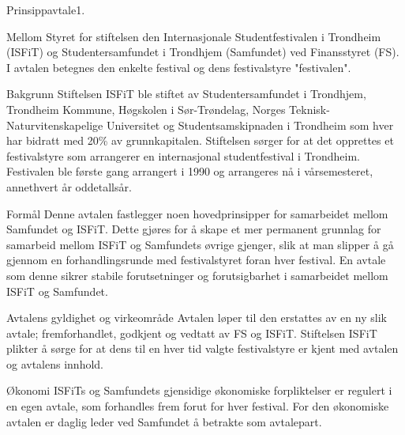 
\begin{instruks}{Prinsippavtale}{1. }{ }

    \begin{instruksledd}{Mellom Styret for stiftelsen den Internasjonale Studentfestivalen i
        Trondheim (ISFiT) og Studentersamfundet i Trondhjem (Samfundet) ved Finansstyret (FS).}
        I avtalen betegnes den enkelte festival og dens festivalstyre "festivalen".
    \end{instruksledd}

    \begin{instruksledd}{Bakgrunn}
        Stiftelsen ISFiT ble stiftet av Studentersamfundet i Trondhjem, Trondheim Kommune, Høgskolen
        i Sør-Trøndelag, Norges Teknisk-Naturvitenskapelige Universitet og Studentsamskipnaden i Trondheim
        som hver har bidratt med 20\% av grunnkapitalen. Stiftelsen sørger for at det opprettes et
        festivalstyre som arrangerer en internasjonal studentfestival i Trondheim. Festivalen ble første
        gang arrangert i 1990 og arrangeres nå i vårsemesteret, annethvert år oddetallsår.
    \end{instruksledd}

    \begin{instruksledd}{Formål}
        Denne avtalen fastlegger noen hovedprinsipper for samarbeidet mellom Samfundet og ISFiT.
        Dette gjøres for å skape et mer permanent grunnlag for samarbeid mellom ISFiT og Samfundets øvrige
        gjenger, slik at man slipper å gå gjennom en forhandlingsrunde med festivalstyret foran hver
        festival. En avtale som denne sikrer stabile forutsetninger og forutsigbarhet i samarbeidet mellom
        ISFiT og Samfundet.
    \end{instruksledd}        

    \begin{instruksledd}{Avtalens gyldighet og virkeområde}
        Avtalen løper til den erstattes av en ny slik avtale; fremforhandlet, godkjent og
        vedtatt av FS og ISFiT. Stiftelsen ISFiT plikter å sørge for at dens til en hver tid valgte
        festivalstyre er kjent med avtalen og avtalens innhold.
    \end{instruksledd}

    \begin{instruksledd}{Økonomi}
        ISFiTs og Samfundets gjensidige økonomiske forpliktelser er regulert i en egen avtale, som
        forhandles frem forut for hver festival. For den økonomiske avtalen er daglig leder ved Samfundet å
        betrakte som avtalepart.
    \end{instruksledd}


\end{instruks}
